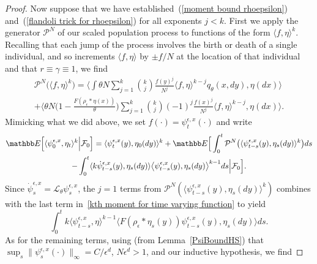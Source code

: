 \documentclass[EJP]{ejpecp} %
\newcommand{\IE}{\mathbb E}
\newcommand{\Pgen}{\mathcal{P}}    %
\begin{document}
\begin{proof}
Now suppose that we have established~(\ref{moment bound rhoepsilon}) 
and~(\ref{flandoli trick for rhoepsilon}) for all exponents $j<k$.
First we apply the generator $\Pgen^N$ of our scaled population process
to functions of the form $\langle f,\eta\rangle^k$.
Recalling that each jump of the process involves the birth or death of a single 
individual, and so increments $\langle f,\eta\rangle$ by $\pm f/N$ at the location of
that individual and that $r \equiv \gamma \equiv 1$, we find 
\begin{multline}
\label{pgen applied to kth moment}
\Pgen^N\Big(\langle f,\eta\rangle^k\Big)
=
\Big\langle
\int\theta N
    \sum_{j=1}^k \binom{k}{j} \frac{f(y)^j}{N^j} \langle f, \eta\rangle^{k-j}
    q_\theta(x,dy),\eta(dx)\Big\rangle
\\
+
    \Big\langle\theta N\Big(1-\frac{F(\rho_\epsilon*\eta(x))}{\theta}\Big)
    \sum_{j=1}^k \binom{k}{j} (-1)^j \frac{f(x)^j}{N^j} \langle f, \eta\rangle^{k-j}
    ,\eta(dx)\Big\rangle.
\end{multline}
Mimicking what we did above, we set $f(\cdot)=\psi^{\epsilon,x}_t(\cdot)$ and 
write
\begin{multline}
\label{kth moment for time varying function}
\IE\Big[\langle \psi^{\epsilon,x}_0,\eta_t\rangle^k\Big|{\cal F}_0\Big]
=\langle\psi^{\epsilon, x}_t(y),\eta_0(dy)\rangle^k
+\IE\Big[\int_0^t\Pgen^N\big(\langle\psi^{\epsilon,x}_{t-s}(y),\eta_s(dy)\rangle^k\big) ds
\\
-\int_0^t\langle k\dot{\psi}^{\epsilon,x}_{t-s}(y), \eta_s(dy)\rangle
\big\langle \psi^{\epsilon, x}_{t-s}(y),\eta_s(dy)\big\rangle^{k-1}ds
\Big|{\cal F}_0\Big].
\end{multline}
Since $\dot \psi^{\epsilon,x}_s = \mathcal{L}_\theta \psi^{\epsilon,x}_s$,
the $j=1$ terms from $\Pgen^N(\langle \psi^{\epsilon,x}_{t-s}(y),\eta_s(dy) \rangle^k)$
combines with the last term in~\eqref{kth moment for time varying function}
to yield 
$$ \int_0^t k \langle \psi^{\epsilon,x}_{t-s},\eta\rangle^{k-1} \langle F(\rho_\epsilon*\eta_s(y)) \psi^{\epsilon,x}_{t-s}(y), \eta_s(dy) \rangle ds . $$
As for the remaining terms, using (from Lemma~\ref{PsiBoundHS}) 
that $\sup_s\|\psi^{\epsilon,x}_s(\cdot)\|_\infty=C/\epsilon^d$,
$N\epsilon^d>1$,
and our inductive
hypothesis, we find

\end{proof}
\end{document}
